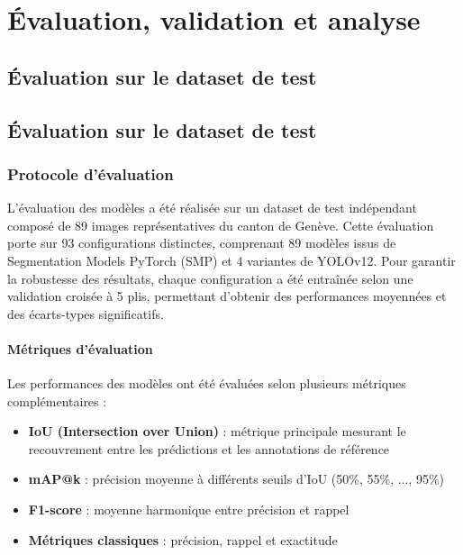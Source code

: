 \chapter{Évaluation, validation et analyse}
\label{chap:eval_valid_modele}

\lipsum[1]

\localtableofcontents

\newpage

\section{Évaluation sur le dataset de test}
\section{Évaluation sur le dataset de test}

\subsection{Protocole d'évaluation}

L'évaluation des modèles a été réalisée sur un dataset de test indépendant composé de 89 images représentatives du canton de Genève. Cette évaluation porte sur 93 configurations distinctes, comprenant 89 modèles issus de Segmentation Models PyTorch (SMP) et 4 variantes de YOLOv12. Pour garantir la robustesse des résultats, chaque configuration a été entraînée selon une validation croisée à 5 plis, permettant d'obtenir des performances moyennées et des écarts-types significatifs.

\subsubsection{Métriques d'évaluation}

Les performances des modèles ont été évaluées selon plusieurs métriques complémentaires :

\begin{itemize}
    \item \textbf{IoU (Intersection over Union)} : métrique principale mesurant le recouvrement entre les prédictions et les annotations de référence
    \item \textbf{mAP@k} : précision moyenne à différents seuils d'IoU (50\%, 55\%, ..., 95\%)
    \item \textbf{F1-score} : moyenne harmonique entre précision et rappel
    \item \textbf{Métriques classiques} : précision, rappel et exactitude
\end{itemize}


